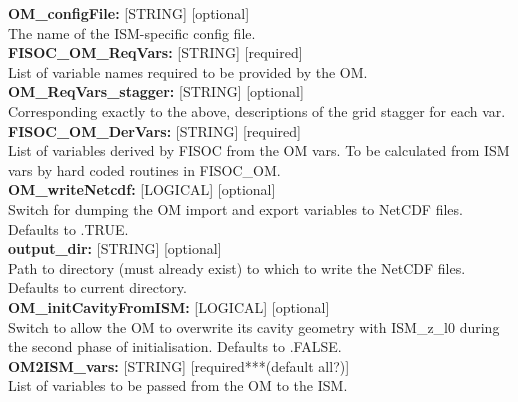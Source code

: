 \documentclass[12pt]{article}
\begin{document}
\begin{flushleft}
\textbf{OM\_configFile:}      [STRING] [optional]                          \\
The name of the ISM-specific config file.                                  \\
\vspace{6pt}
\textbf{FISOC\_OM\_ReqVars:}  [STRING] [required]                          \\
List of variable names required to be provided by the OM.                  \\
\vspace{6pt}
\textbf{OM\_ReqVars\_stagger:} [STRING] [optional]                         \\
Corresponding exactly to the above, descriptions of the grid stagger for each var. \\
\vspace{6pt}
\textbf{FISOC\_OM\_DerVars:}  [STRING] [required]                          \\
List of variables derived by FISOC from the OM vars.  
To be calculated from ISM vars by hard coded routines in FISOC\_OM.        \\
\vspace{6pt}
\textbf{OM\_writeNetcdf:}   [LOGICAL] [optional]                           \\
Switch for dumping the OM import and export variables to NetCDF files.
Defaults to .TRUE.                                                         \\
\vspace{6pt}
\textbf{output\_dir:}  [STRING] [optional]                                 \\
Path to directory (must already exist) to which to write the NetCDF files. 
Defaults to current directory.                                             \\
\vspace{6pt}
\textbf{OM\_initCavityFromISM:}  [LOGICAL] [optional]                      \\
Switch to allow the OM to overwrite its cavity geometry with ISM\_z\_l0 
during the second phase of initialisation.
Defaults to .FALSE.                                                        \\
\vspace{6pt}
\textbf{OM2ISM\_vars:}        [STRING] [required***(default all?)]                          \\
List of variables to be passed from the OM to the ISM.                     \\ 

\end{flushleft}
\end{document}
